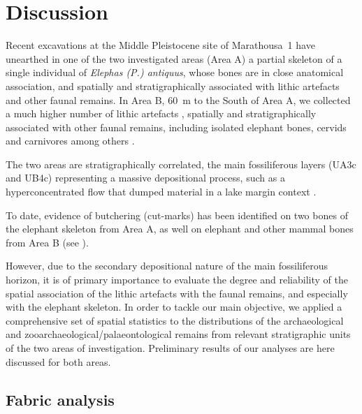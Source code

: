 \documentclass[preprint,authoryear,times]{elsarticle} %
\begin{document}
\section{Discussion}

Recent excavations at the Middle Pleistocene site of Marathousa~1 have unearthed in one of the two investigated areas (Area A) a partial skeleton of a single individual of \emph{Elephas (P.) antiquus}, whose bones are in close anatomical association, and spatially and stratigraphically associated with lithic artefacts and other faunal remains. In Area B, 60~m to the South of Area A, we collected a much higher number of lithic artefacts \citep{Tourloukis}, spatially and stratigraphically associated with other faunal remains, including isolated elephant bones, cervids and carnivores among others \citep{Konidaris}.

The two areas are stratigraphically correlated, the main fossiliferous layers (UA3c and UB4c) representing a massive depositional process, such as a hyperconcentrated flow that dumped material in a lake margin context \citep{Karkanas}.

To date, evidence of butchering (cut-marks) has been identified on two bones of the elephant skeleton from Area A, as well on elephant and other mammal bones from Area B (see \cite{Konidaris}).

However, due to the secondary depositional nature of the main fossiliferous horizon, it is of primary importance to evaluate the degree and reliability of the spatial association of the lithic artefacts with the faunal remains, and especially with the elephant skeleton. In order to tackle our main objective, we applied a comprehensive set of spatial statistics to the distributions of the archaeological and zooarchaeological/palaeontological remains from relevant stratigraphic units of the two areas of investigation. Preliminary results of our analyses are here discussed for both areas.

\subsection{Fabric analysis}


\end{document}
